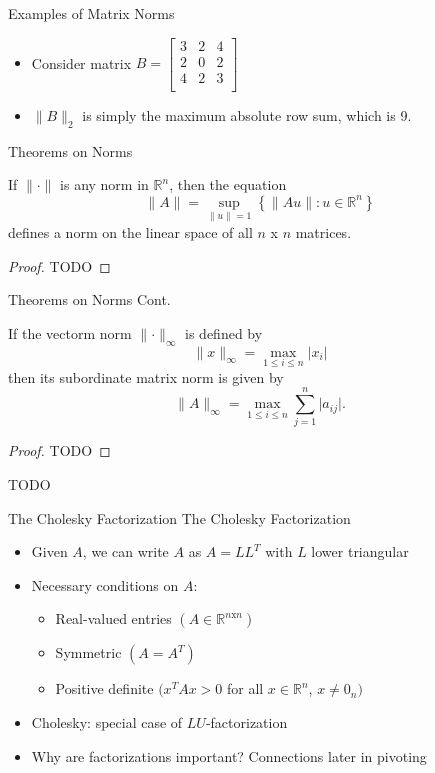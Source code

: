\documentclass[9pt, serif]{beamer}
\newlength{\wideitemsep}
\let\olditem\item
\renewcommand{\item}{\setlength{\itemsep}{\wideitemsep}\olditem}
\newcommand{\bi}{\begin{itemize}}
\newcommand{\ei}{\end{itemize}}
\newcommand{\abs}[1]{\lvert#1\rvert}
\newcommand{\norm}[1]{\lVert#1\rVert}
\begin{document}
\begin{frame}{Examples of Matrix Norms}
    \bi
        \item Consider matrix
        $B = \begin{bmatrix}
            3 & 2 & 4 \\
            2 & 0 & 2 \\
            4 & 2 & 3 \\
        \end{bmatrix}$
        \pause
        \item $\norm{B}_2$ is simply the maximum absolute row sum, which is 9.
    \ei
\end{frame}


\begin{frame}{Theorems on Norms}
    \begin{theorem}
        If $\norm{\cdot}$ is any norm in $\mathbb{R}^n$, then the equation 
        $$\norm{A} = \sup_{\norm{u}=1}\left\{\norm{Au}:u\in\mathbb{R}^n\right\}$$ defines a norm on the linear space of all $n$ x $n$
        matrices.
    \end{theorem} \pause
    \begin{proof}
        TODO
    \end{proof}
\end{frame}


\begin{frame}{Theorems on Norms Cont.}
    \begin{theorem}
        If the vectorm norm $\norm{\cdot}_\infty$ is defined by $$\norm{x}_\infty = \max_{1\le i\le n} \abs{x_i}$$ then its subordinate matrix
        norm is given by $$\norm{A}_\infty = \max_{1\le i \le n} \sum_{j=1}^n \abs{a_{ij}}.$$
    \end{theorem} \pause
    \begin{proof}
        TODO
    \end{proof}
\end{frame}


\begin{frame}
    TODO
\end{frame}


\begin{frame}{The Cholesky Factorization}
The Cholesky Factorization \pause
\bi
\item Given $A$, we can write $A$ as  $A=LL^T$ with $L$ lower triangular\pause
\item Necessary conditions on $A$:\pause
	\bi \item Real-valued entries $(A \in \mathbb{R}^{n\text{x}n})$
	\item Symmetric $(A = A^T)$
	\item Positive definite $(x^TAx > 0$ for all $x \in \mathbb{R}^n$, $x \ne 0_n)$ \pause
	\ei
\item Cholesky: special case of $LU$-factorization\pause
\item Why are factorizations important?  Connections later in pivoting \pause
\ei
\end{frame}
\end{document}
